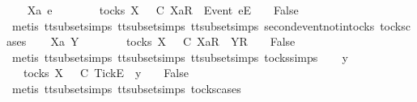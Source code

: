 \isamarkupfalse%
\isanewline
\ \ \isamarkupfalse%
\ Xa\ e\ {\isasymrho}\ {\isasymsigma}\isanewline
\ \ \isamarkupfalse%
\ {\isachardoublequoteopen}{\isasymrho}\ {\isasymin}\ tocks\ X\ {\isasymLongrightarrow}\ {\isasymrho}\ {\isasymsubseteq}\isactrlsub C\ {\isacharbrackleft}Xa{\isacharbrackright}\isactrlsub R\ {\isacharhash}\ {\isacharbrackleft}Event\ e{\isacharbrackright}\isactrlsub E\ {\isacharhash}\ {\isasymsigma}\ {\isasymLongrightarrow}\ False{\isachardoublequoteclose}\isanewline
\ \ \ \ \isamarkupfalse%
\ {\isacharparenleft}metis\ tt{\isacharunderscore}subset{\isachardot}simps{\isacharparenleft}{}{\isacharparenright}\ tt{\isacharunderscore}subset{\isachardot}simps{\isacharparenleft}{}{\isacharparenright}\ tt{\isacharunderscore}subset{\isachardot}simps{\isacharparenleft}{}{\isacharparenright}\ second{\isacharunderscore}event{\isacharunderscore}notin{\isacharunderscore}tocks\ tocks{\isachardot}cases{\isacharparenright}\isanewline
{}\isamarkupfalse%
\isanewline
\ \ \isamarkupfalse%
\ Xa\ Y\ {\isasymrho}\ {\isasymsigma}\isanewline
\ \ \isamarkupfalse%
\ {\isachardoublequoteopen}{\isasymrho}\ {\isasymin}\ tocks\ X\ {\isasymLongrightarrow}\ {\isasymrho}\ {\isasymsubseteq}\isactrlsub C\ {\isacharbrackleft}Xa{\isacharbrackright}\isactrlsub R\ {\isacharhash}\ {\isacharbrackleft}Y{\isacharbrackright}\isactrlsub R\ {\isacharhash}\ {\isasymsigma}\ {\isasymLongrightarrow}\ False{\isachardoublequoteclose}\isanewline
\ \ \ \ \isamarkupfalse%
\ {\isacharparenleft}metis\ tt{\isacharunderscore}subset{\isachardot}simps{\isacharparenleft}{}{\isacharparenright}\ tt{\isacharunderscore}subset{\isachardot}simps{\isacharparenleft}{}{\isacharparenright}\ tt{\isacharunderscore}subset{\isachardot}simps{\isacharparenleft}{}{\isacharparenright}\ tocks{\isachardot}simps{\isacharparenright}\isanewline
{}\isamarkupfalse%
\isanewline
\ \ \isamarkupfalse%
\ y\ {\isasymrho}\ {\isasymsigma}\isanewline
\ \ \isamarkupfalse%
\ {\isachardoublequoteopen}{\isasymrho}\ {\isasymin}\ tocks\ X\ {\isasymLongrightarrow}\ {\isasymrho}\ {\isasymsubseteq}\isactrlsub C\ {\isacharbrackleft}Tick{\isacharbrackright}\isactrlsub E\ {\isacharhash}\ y\ {\isacharhash}\ {\isasymsigma}\ {\isasymLongrightarrow}\ False{\isachardoublequoteclose}\isanewline
\ \ \ \ \isamarkupfalse%
\ {\isacharparenleft}metis\ tt{\isacharunderscore}subset{\isachardot}simps{\isacharparenleft}{}{}{\isacharparenright}\ tt{\isacharunderscore}subset{\isachardot}simps{\isacharparenleft}{}{\isacharparenright}\ tocks{\isachardot}cases{\isacharparenright}\isanewline
